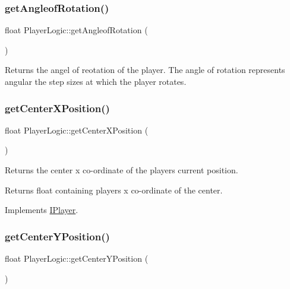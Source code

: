 \subsubsection{\texorpdfstring{get\+Angleof\+Rotation()}{getAngleofRotation()}}
{\footnotesize\ttfamily float Player\+Logic\+::get\+Angleof\+Rotation (\begin{DoxyParamCaption}{ }\end{DoxyParamCaption})}



Returns the angel of reotation of the player. The angle of rotation represents angular the step sizes at which the player rotates. 

\mbox{\label{class_player_logic_a6bdec8d007701c16a3cbb87e7fdfe0e6}} 
\subsubsection{\texorpdfstring{get\+Center\+X\+Position()}{getCenterXPosition()}}
{\footnotesize\ttfamily float Player\+Logic\+::get\+Center\+X\+Position (\begin{DoxyParamCaption}{ }\end{DoxyParamCaption})\hspace{0.3cm}{\ttfamily [virtual]}}



Returns the center x co-\/ordinate of the player\textquotesingle{}s current position. 

\begin{DoxyReturn}{Returns}
float containing players x co-\/ordinate of the center. 
\end{DoxyReturn}


Implements \hyperlink{class_i_player_a10d652f5066f96f3526242448de3a6e2}{I\+Player}.

\mbox{\label{class_player_logic_ad7b9048aee0c7b58443055f37f871537}} 
\subsubsection{\texorpdfstring{get\+Center\+Y\+Position()}{getCenterYPosition()}}
{\footnotesize\ttfamily float Player\+Logic\+::get\+Center\+Y\+Position (\begin{DoxyParamCaption}{ }\end{DoxyParamCaption})\hspace{0.3cm}{\ttfamily [virtual]}}



